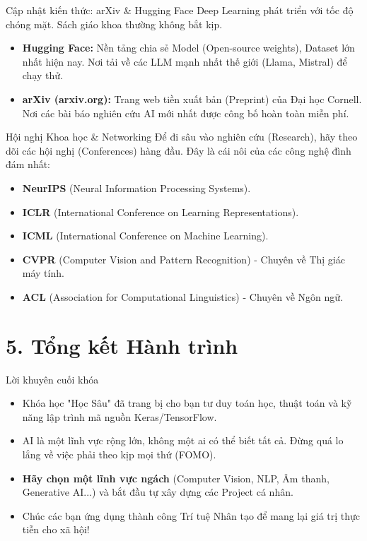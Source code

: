 \documentclass[aspectratio=169]{beamer}
\begin{document}
\begin{frame}{Cập nhật kiến thức: arXiv \& Hugging Face}
    Deep Learning phát triển với tốc độ chóng mặt. Sách giáo khoa thường không bắt kịp.
    \begin{itemize}
        \item \textbf{Hugging Face:} Nền tảng chia sẻ Model (Open-source weights), Dataset lớn nhất hiện nay. Nơi tải về các LLM mạnh nhất thế giới (Llama, Mistral) để chạy thử.
        \item \textbf{arXiv (arxiv.org):} Trang web tiền xuất bản (Preprint) của Đại học Cornell. Nơi các bài báo nghiên cứu AI mới nhất được công bố hoàn toàn miễn phí.
    \end{itemize}
\end{frame}

\begin{frame}{Hội nghị Khoa học \& Networking}
    Để đi sâu vào nghiên cứu (Research), hãy theo dõi các hội nghị (Conferences) hàng đầu. Đây là cái nôi của các công nghệ đình đám nhất:
    \begin{itemize}
        \item \textbf{NeurIPS} (Neural Information Processing Systems).
        \item \textbf{ICLR} (International Conference on Learning Representations).
        \item \textbf{ICML} (International Conference on Machine Learning).
        \item \textbf{CVPR} (Computer Vision and Pattern Recognition) - Chuyên về Thị giác máy tính.
        \item \textbf{ACL} (Association for Computational Linguistics) - Chuyên về Ngôn ngữ.
    \end{itemize}
\end{frame}

\section{5. Tổng kết Hành trình}

\begin{frame}{Lời khuyên cuối khóa}
    \begin{itemize}
        \item Khóa học "Học Sâu" đã trang bị cho bạn tư duy toán học, thuật toán và kỹ năng lập trình mã nguồn Keras/TensorFlow.
        \item AI là một lĩnh vực rộng lớn, không một ai có thể biết tất cả. Đừng quá lo lắng về việc phải theo kịp mọi thứ (FOMO).
        \item \textbf{Hãy chọn một lĩnh vực ngách} (Computer Vision, NLP, Âm thanh, Generative AI...) và bắt đầu tự xây dựng các Project cá nhân.
        \item Chúc các bạn ứng dụng thành công Trí tuệ Nhân tạo để mang lại giá trị thực tiễn cho xã hội!
    \end{itemize}
\end{frame}
\end{document}
